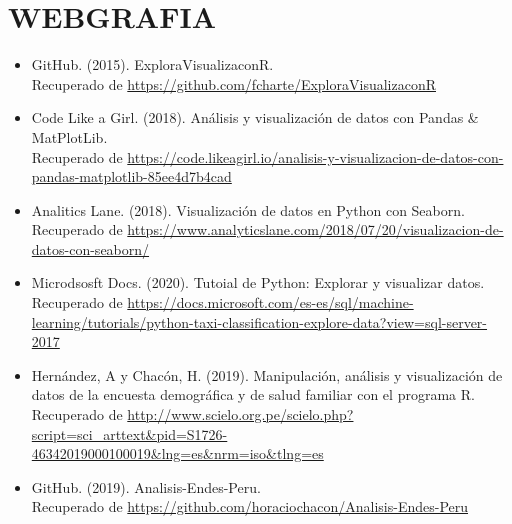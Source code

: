\documentclass[12pt,letterpaper]{article}
\begin{document}
    \section{WEBGRAFIA}
    \begin{itemize}
        \item GitHub. (2015). ExploraVisualizaconR.\\
        Recuperado de \textcolor{azul}{\url{https://github.com/fcharte/ExploraVisualizaconR}}
        \item Code Like a Girl. (2018). Análisis y visualización de datos con Pandas \& MatPlotLib.\\
        Recuperado de \textcolor{azul}{\url{https://code.likeagirl.io/analisis-y-visualizacion-de-datos-con-pandas-matplotlib-85ee4d7b4cad}}
        \item Analitics Lane. (2018). Visualización de datos en Python con Seaborn.\\
        Recuperado de \textcolor{azul}{\url{https://www.analyticslane.com/2018/07/20/visualizacion-de-datos-con-seaborn/}}
        \item Microdsosft Docs. (2020). Tutoial de Python: Explorar y visualizar datos.\\
        Recuperado de \textcolor{azul}{\url{https://docs.microsoft.com/es-es/sql/machine-learning/tutorials/python-taxi-classification-explore-data?view=sql-server-2017}}
        \item Hernández, A y Chacón, H. (2019). Manipulación, análisis y visualización de datos de la encuesta demográfica y de salud familiar con el programa R.\\
        Recuperado de \textcolor{azul}{\url{http://www.scielo.org.pe/scielo.php?script=sci_arttext&pid=S1726-46342019000100019&lng=es&nrm=iso&tlng=es}}
        \item GitHub. (2019). Analisis-Endes-Peru.\\
        Recuperado de \textcolor{azul}{\url{https://github.com/horaciochacon/Analisis-Endes-Peru}}
    \end{itemize}
\end{document}
